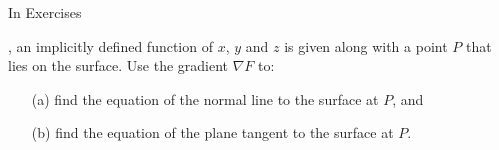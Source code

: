 {\noindent In Exercises}
{, an implicitly defined function of $x$, $y$ and $z$ is given along with a point $P$ that lies on the surface. Use the gradient $\nabla F$ to:
\begin{enumerate}
	\item [(a)] find the equation of the normal line to the surface at $P$, and
	\item	[(b)] find the equation of the plane tangent  to the surface at $P$.
\end{enumerate}
}
